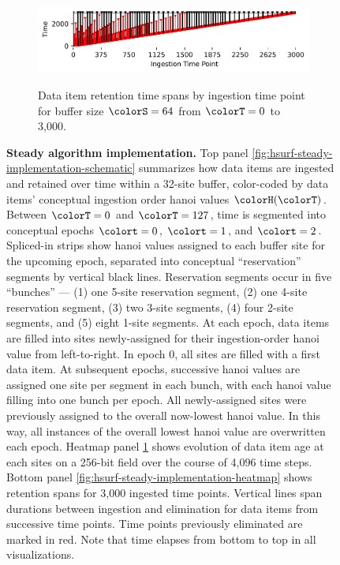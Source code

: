 \begin{figure}[h!]
   \begin{minipage}[]{\textwidth}
   \vspace{-2pt}
  \begin{subfigure}[t]{0.7\linewidth}
  \vspace{0pt}
    \centering
    \includegraphics[width=0.88\linewidth,clip]{binder/teeplots/10/num-generations=262144+surface-size=64+viz=stratum-persistence-dripplot+ext=}
  \end{subfigure}%
  \begin{subfigure}[t]{0.3\linewidth}
  \vspace{-2pt}
  \caption{%
    Data item retention time spans by ingestion time point for buffer size $\colorS=64$ from $\colorT=0$ to 3,000.
  }
  \label{fig:hsurf-steady-implementation-dripplot}
  \end{subfigure}
  \end{minipage}

\vspace{-2ex}\caption{%
  \textbf{Steady algorithm implementation.}
  \footnotesize
  Top panel \ref{fig:hsurf-steady-implementation-schematic} summarizes how data items are ingested and retained over time within a 32-site buffer, color-coded by data items' conceptual ingestion order hanoi values $\colorH(\colorT)$.
  Between $\colorT=0$ and $\colorT=127$, time is segmented into conceptual epochs $\colort=0$, $\colort=1$, and $\colort=2$.
  Spliced-in strips show hanoi values assigned to each buffer site for the upcoming epoch, separated into conceptual ``reservation'' segments by vertical black lines.
  Reservation segments occur in five ``bunches'' --- (1) one 5-site reservation segment, (2) one 4-site reservation segment, (3) two 3-site segments, (4) four 2-site segments, and (5) eight 1-site segments.
  At each epoch, data items are filled into sites newly-assigned for their ingestion-order hanoi value from left-to-right.
  In epoch 0, all sites are filled with a first data item.
  At subsequent epochs, successive hanoi values are assigned one site per segment in each bunch, with each hanoi value filling into one bunch per epoch.
  All newly-assigned sites were previously assigned to the overall now-lowest hanoi value.
  In this way, all instances of the overall lowest hanoi value are overwritten each epoch.
  Heatmap panel \ref{fig:hsurf-steady-implementation-dripplot} shows evolution of data item age at each sites on a 256-bit field over the course of 4,096 time steps.
  Bottom panel \ref{fig:hsurf-steady-implementation-heatmap} shows retention spans for 3,000 ingested time points.
  Vertical lines span durations between ingestion and elimination for data items from successive time points.
  Time points previously eliminated are marked in red.
  Note that time elapses from bottom to top in all visualizations.
  }
\label{fig:hsurf-steady-implementation}

\end{figure}
